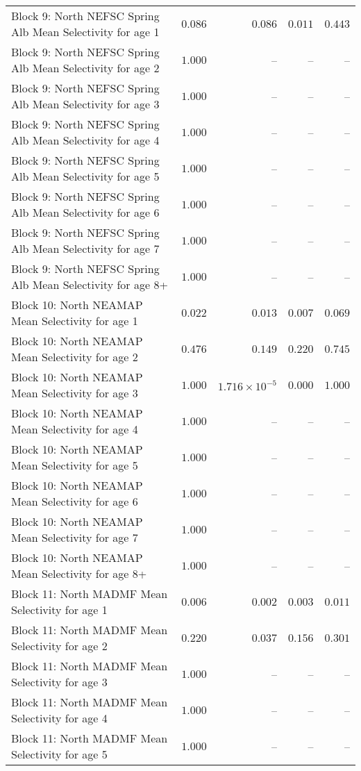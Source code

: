\documentclass[
]{article}
\begin{document}
\begin{landscape}
\begin{longtable}[t]{lrrrr}
Block 9: North NEFSC Spring Alb Mean Selectivity for age 1 & $0.086$ & $0.086$ & $0.011$ & $0.443$\\
Block 9: North NEFSC Spring Alb Mean Selectivity for age 2 & $1.000$ & -- & -- & --\\
Block 9: North NEFSC Spring Alb Mean Selectivity for age 3 & $1.000$ & -- & -- & --\\
Block 9: North NEFSC Spring Alb Mean Selectivity for age 4 & $1.000$ & -- & -- & --\\
\addlinespace
Block 9: North NEFSC Spring Alb Mean Selectivity for age 5 & $1.000$ & -- & -- & --\\
Block 9: North NEFSC Spring Alb Mean Selectivity for age 6 & $1.000$ & -- & -- & --\\
Block 9: North NEFSC Spring Alb Mean Selectivity for age 7 & $1.000$ & -- & -- & --\\
Block 9: North NEFSC Spring Alb Mean Selectivity for age 8+ & $1.000$ & -- & -- & --\\
Block 10: North NEAMAP Mean Selectivity for age 1 & $0.022$ & $0.013$ & $0.007$ & $0.069$\\
\addlinespace
Block 10: North NEAMAP Mean Selectivity for age 2 & $0.476$ & $0.149$ & $0.220$ & $0.745$\\
Block 10: North NEAMAP Mean Selectivity for age 3 & $1.000$ & $1.716\times 10^{-5}$ & $0.000$ & $1.000$\\
Block 10: North NEAMAP Mean Selectivity for age 4 & $1.000$ & -- & -- & --\\
Block 10: North NEAMAP Mean Selectivity for age 5 & $1.000$ & -- & -- & --\\
Block 10: North NEAMAP Mean Selectivity for age 6 & $1.000$ & -- & -- & --\\
\addlinespace
Block 10: North NEAMAP Mean Selectivity for age 7 & $1.000$ & -- & -- & --\\
Block 10: North NEAMAP Mean Selectivity for age 8+ & $1.000$ & -- & -- & --\\
Block 11: North MADMF Mean Selectivity for age 1 & $0.006$ & $0.002$ & $0.003$ & $0.011$\\
Block 11: North MADMF Mean Selectivity for age 2 & $0.220$ & $0.037$ & $0.156$ & $0.301$\\
Block 11: North MADMF Mean Selectivity for age 3 & $1.000$ & -- & -- & --\\
\addlinespace
Block 11: North MADMF Mean Selectivity for age 4 & $1.000$ & -- & -- & --\\
Block 11: North MADMF Mean Selectivity for age 5 & $1.000$ & -- & -- & --\\

\end{longtable}
\end{landscape}
\end{document}
